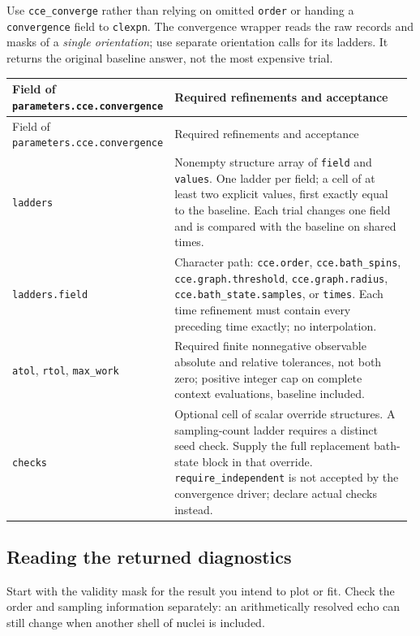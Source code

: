 \documentclass[11pt,a4paper]{article}
\newcommand{\code}[1]{\texttt{#1}}
\begin{document}
\endgroup
Use \code{cce\_converge} rather than relying on omitted \code{order} or handing a \code{convergence} field to \code{clexpn}. The convergence wrapper reads the raw records and masks of a \emph{single orientation}; use separate orientation calls for its ladders. It returns the original baseline answer, not the most expensive trial.

\begingroup\small
\begin{longtable}{@{}>{\raggedright\arraybackslash}p{0.335\linewidth}@{\hspace{0.025\linewidth}}>{\raggedright\arraybackslash}p{0.64\linewidth}@{}}
\toprule
Field of \code{parameters.cce.convergence} & Required refinements and acceptance\\
\midrule\endfirsthead
\toprule
Field of \code{parameters.cce.convergence} & Required refinements and acceptance\\
\midrule\endhead
\midrule\endfoot
\bottomrule\endlastfoot
\code{ladders} & Nonempty structure array of \code{field} and \code{values}. One ladder per field; a cell of at least two explicit values, first exactly equal to the baseline. Each trial changes one field and is compared with the baseline on shared times.\\
\code{ladders.field} & Character path: \code{cce.order}, \code{cce.bath\_spins}, \code{cce.graph.threshold}, \code{cce.graph.radius}, \code{cce.bath\_state.samples}, or \code{times}. Each time refinement must contain every preceding time exactly; no interpolation.\\
\code{atol}, \code{rtol}, \code{max\_work} & Required finite nonnegative observable absolute and relative tolerances, not both zero; positive integer cap on complete context evaluations, baseline included.\\
\code{checks} & Optional cell of scalar override structures. A sampling-count ladder requires a distinct seed check. Supply the full replacement bath-state block in that override. \code{require\_independent} is not accepted by the convergence driver; declare actual checks instead.\\
\end{longtable}
\endgroup

\subsection{Reading the returned diagnostics}
Start with the validity mask for the result you intend to plot or fit. Check the order and sampling information separately: an arithmetically resolved echo can still change when another shell of nuclei is included.
\end{document}
